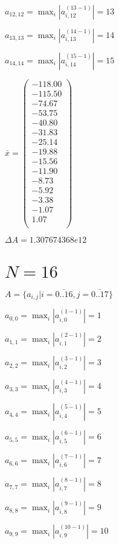 \documentclass[a4paper,12pt]{article}
\begin{document}
$a _{ 12, 12 } =  \max _i |a _{ i, 12 } ^{ (13 - 1) } | = 13$

$a _{ 13, 13 } =  \max _i |a _{ i, 13 } ^{ (14 - 1) } | = 14$

$a _{ 14, 14 } =  \max _i |a _{ i, 14 } ^{ (15 - 1) } | = 15$

$\bar { x } = \begin{pmatrix}
-118.00 \\
-115.50 \\
-74.67 \\
-53.75 \\
-40.80 \\
-31.83 \\
-25.14 \\
-19.88 \\
-15.56 \\
-11.90 \\
-8.73 \\
-5.92 \\
-3.38 \\
-1.07 \\
1.07 \\
\end{pmatrix}
$

$\Delta A = 1.307674368e12$



\section{ $N = 16$ }
$A = \{ a _{ i, j } | i = \bar { 0..16 }, j = \bar { 0..17 } \}$

$a _{ 0, 0 } =  \max _i |a _{ i, 0 } ^{ (1 - 1) } | = 1$

$a _{ 1, 1 } =  \max _i |a _{ i, 1 } ^{ (2 - 1) } | = 2$

$a _{ 2, 2 } =  \max _i |a _{ i, 2 } ^{ (3 - 1) } | = 3$

$a _{ 3, 3 } =  \max _i |a _{ i, 3 } ^{ (4 - 1) } | = 4$

$a _{ 4, 4 } =  \max _i |a _{ i, 4 } ^{ (5 - 1) } | = 5$

$a _{ 5, 5 } =  \max _i |a _{ i, 5 } ^{ (6 - 1) } | = 6$

$a _{ 6, 6 } =  \max _i |a _{ i, 6 } ^{ (7 - 1) } | = 7$

$a _{ 7, 7 } =  \max _i |a _{ i, 7 } ^{ (8 - 1) } | = 8$

$a _{ 8, 8 } =  \max _i |a _{ i, 8 } ^{ (9 - 1) } | = 9$

$a _{ 9, 9 } =  \max _i |a _{ i, 9 } ^{ (10 - 1) } | = 10$
\end{document}
